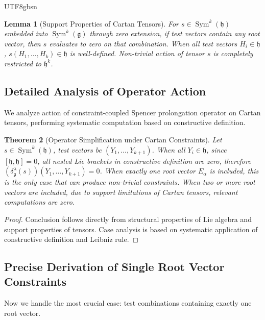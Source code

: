 \documentclass[a4paper,12pt]{extarticle}
\newtheorem{theorem}{Theorem}[section]
\newtheorem{lemma}[theorem]{Lemma}
\theoremstyle{definition}
\begin{document}
\begin{CJK}{UTF8}{gbsn}
\begin{lemma}[Support Properties of Cartan Tensors]
\label{lem:cartan_tensor_support}
For $s \in \operatorname{Sym}^k(\mathfrak{h})$ embedded into $\operatorname{Sym}^k(\mathfrak{g})$ through zero extension, if test vectors contain any root vector, then $s$ evaluates to zero on that combination. When all test vectors $H_i \in \mathfrak{h}$, $s(H_1, \ldots, H_k) \in \mathfrak{h}$ is well-defined. Non-trivial action of tensor $s$ is completely restricted to $\mathfrak{h}^k$.
\end{lemma}

\subsection{Detailed Analysis of Operator Action}
\label{subsec:detailed_operator_analysis}

We analyze action of constraint-coupled Spencer prolongation operator on Cartan tensors, performing systematic computation based on constructive definition.

\begin{theorem}[Operator Simplification under Cartan Constraints]
\label{thm:operator_simplification_cartan}
Let $s \in \operatorname{Sym}^k(\mathfrak{h})$, test vectors be $(Y_1, \ldots, Y_{k+1})$. When all $Y_i \in \mathfrak{h}$, since $[\mathfrak{h}, \mathfrak{h}] = 0$, all nested Lie brackets in constructive definition are zero, therefore $(\delta^\lambda_\mathfrak{g}(s))(Y_1, \ldots, Y_{k+1}) = 0$. When exactly one root vector $E_\alpha$ is included, this is the only case that can produce non-trivial constraints. When two or more root vectors are included, due to support limitations of Cartan tensors, relevant computations are zero.
\end{theorem}

\begin{proof}
Conclusion follows directly from structural properties of Lie algebra and support properties of tensors. Case analysis is based on systematic application of constructive definition and Leibniz rule.
\end{proof}

\subsection{Precise Derivation of Single Root Vector Constraints}
\label{subsec:single_root_constraint_derivation}

Now we handle the most crucial case: test combinations containing exactly one root vector.


\end{CJK}
\end{document}
